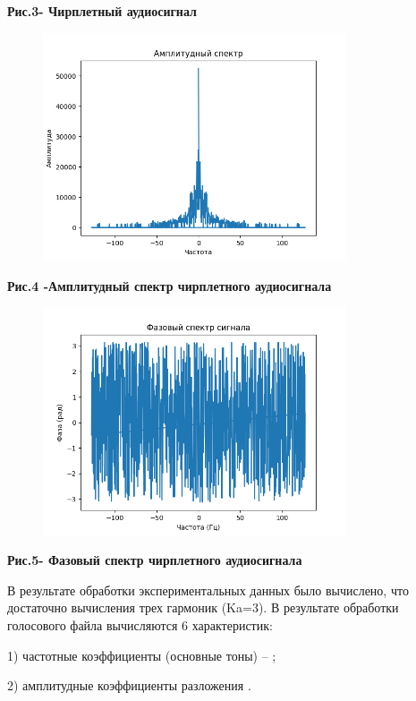 {\bfseries Рис.3- Чирплетный аудиосигнал}


\begin{figure}[H]
	\centering
	\includegraphics[width=0.8\textwidth]{media/ict/image67}
	\caption*{}
\end{figure}


{\bfseries Рис.4 -Амплитудный спектр чирплетного аудиосигнала}


\begin{figure}[H]
	\centering
	\includegraphics[width=0.8\textwidth]{media/ict/image68}
	\caption*{}
\end{figure}


{\bfseries Рис.5- Фазовый спектр чирплетного аудиосигнала}

В результате обработки экспериментальных данных было вычислено, что
достаточно вычисления трех гармоник (Ka=3). В результате обработки
голосового файла вычисляются 6 характеристик:

1) частотные коэффициенты (основные тоны) --
;

2) амплитудные коэффициенты разложения
.

